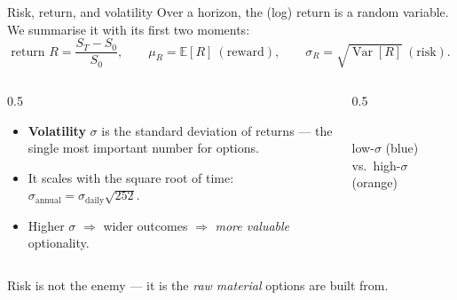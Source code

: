 \documentclass[11pt,aspectratio=169]{beamer}
\newcommand{\E}{\mathbb{E}}                 %
\newcommand{\Var}{\operatorname{Var}}
\newcommand{\und}{S}                         %
\newcommand{\keybox}[1]{%
  \begin{beamercolorbox}[wd=\textwidth,sep=0.6em,rounded=true]{}%
    \colorbox{soft}{\parbox{\dimexpr\textwidth-1.4em}{\color{ink}#1}}%
  \end{beamercolorbox}}
\begin{document}
\begin{frame}{Risk, return, and volatility}
  Over a horizon, the (log) return is a random variable. We summarise it
  with its first two moments:
  \[
    \text{return } R = \frac{\und_T-\und_0}{\und_0},\qquad
    \mu_R=\E[R]\ (\text{reward}),\qquad
    \sigma_R=\sqrt{\Var[R]}\ (\text{risk}).
  \]
  \begin{columns}[T]
    \begin{column}{0.5\textwidth}
      \begin{itemize}
        \item \textbf{Volatility} $\sigma$ is the standard deviation of returns — the single most important number for options.
        \item It scales with the square root of time: $\sigma_{\text{annual}} = \sigma_{\text{daily}}\sqrt{252}$.
        \item Higher $\sigma$ $\Rightarrow$ wider outcomes $\Rightarrow$ \emph{more valuable} optionality.
      \end{itemize}
    \end{column}
    \begin{column}{0.5\textwidth}
      \centering
      \\
      {\tiny\color{muted}low-$\sigma$ (blue) vs.\ high-$\sigma$ (orange)}
    \end{column}
  \end{columns}
  \vspace{0.2em}
  \keybox{Risk is not the enemy — it is the \emph{raw material} options are built from.}
\end{frame}
\end{document}
